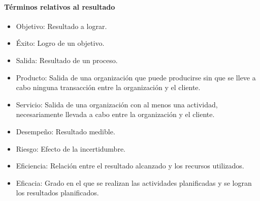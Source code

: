 		\paragraph{Términos relativos al resultado}
		\begin{itemize}
			\item Objetivo: Resultado a lograr.
			
			\item Éxito: Logro de un objetivo.
			
			\item Salida: Resultado de un proceso.
			
			\item Producto: Salida de una organización que puede producirse sin que se lleve a cabo ninguna transacción entre la organización y el cliente.
			
			\item Servicio: Salida de una organización con al menos una actividad, necesariamente llevada a cabo
			entre la organización y el cliente.
			
			\item Desempeño: Resultado medible.
			
			\item Riesgo: Efecto de la incertidumbre.
			
			\item Eficiencia: Relación entre el resultado alcanzado y los recursos utilizados.
			
\newpage
\thispagestyle{plain}
			
			\item Eficacia: Grado en el que se realizan las actividades planificadas y se logran los resultados planificados.
			
		\end{itemize}
	
